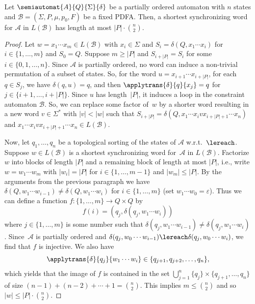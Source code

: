 \begin{proposition}
	\label{constr_input:prop:length_constr_sync_word_in_waa}
	Let $\semiautomat{A}{Q}{\Sigma}{\delta}$ 
	be a partially ordered automaton with $n$ states and $\mathcal B = (\Sigma, P, \mu, p_0, F)$ be a fixed PDFA.
	Then, a shortest synchronizing word for $\mathcal A$ in $L(\mathcal B)$ 
	has length at most $|P|\cdot \binom{n}{2}$.
\end{proposition}
\begin{proof}
	Let $w = x_1 \cdots x_m \in L(\mathcal B)$
	with $x_i \in \Sigma$ and $S_i = \delta(Q, x_1 \cdots x_i)$  
	for $i \in \{1,\ldots,m\}$ and $S_0 = Q$.
	Suppose $m \ge |P|$ and $S_{i+ |P|} = S_i$
	for some $i \in \{0, 1,\ldots, n\}$.
	Since $\mathcal A$ is partially ordered, 
	no word can induce a non-trivial permutation of a subset of states.
	So, for the word $u = x_{i+1} \cdots x_{i + |P|}$, for each $q \in S_j$,
	we have $\delta(q, u) = q$,
    and then $\applytrans{\delta}{q}{x_j} = q$ for $j\in \{i+1,\ldots,i+|P|\}$.
	Since $u$ has length~$|P|$, it induces a loop in the constraint automaton $\mathcal B$.
	So, we can replace some factor of~$w$
	by a shorter word resulting in a new word $v \in \Sigma^*$ with $|v| < |w|$
	such that
	$ 
	S_{i + |P|} = \delta(Q, x_1\cdots x_i v x_{i + |P| + 1} \cdots x_n)
	$
	and $x_1\cdots x_i v x_{i + |P| + 1} \cdots x_n \in L(\mathcal B)$.

	Now, let $q_1 ,\ldots, q_n$ be a topological sorting of the states of $\mathcal A$ w.r.t.~$\lereach$.
	Suppose $w \in L(\mathcal B)$
	is a shortest synchronizing word for~$\mathcal A$ in $L(\mathcal B)$. 
	Factorize $w$ into blocks of length $|P|$ and a remaining block of length at most $|P|$, i.e.,
	write $w = w_1 \cdots w_m$
	with $|w_i| = |P|$ for $i \in \{1,\ldots,m-1\}$
	and $|w_m| \le |P|$.
	By the arguments from the previous paragraph
	we have $\delta(Q, w_1 \cdots w_{i-1}) \ne \delta(Q, w_1 \cdots w_i)$
	for $i \in \{1,\ldots,m\}$ (set $w_1 \cdots w_0 = \varepsilon$).
	Thus we can define a function $f \colon \{1,\ldots,m\} \to Q \times Q$
	by
	\[
	f(i) = (q_j, \delta(q_j, w_1 \cdots w_i))
	\]
	where $j \in \{1,\ldots,m\}$ is some number
    such that $\delta(q_j, w_1 \cdots w_{i-1}) \ne \delta(q_j, w_1 \cdots w_i)$.
    Since~$\mathcal A$ is partially ordered
	and 
	$\delta(q_j, w_0 \cdots w_{i-1}) \lereach 
	\delta(q_j, w_0 \cdots w_{i})$, we find that $f$ is injective.
	We also have 
	\[
	\applytrans{\delta}{q_j}{w_1 \cdots w_i} \in \{q_{j+1}, q_{j+2}, \ldots, q_n\},
	\]
	which yields that the image of $f$ is contained in the set $\bigcup_{j=1}^n \{q_j\} \times \{q_{j+1},\ldots,q_n\}$
	of size $(n-1) + (n-2) + \cdots + 1 = \binom{n}{2}$.
	This implies $m \le \binom{n}{2}$ and so $|w| \le |P| \cdot \binom{n}{2}$.
	

\end{proof}
